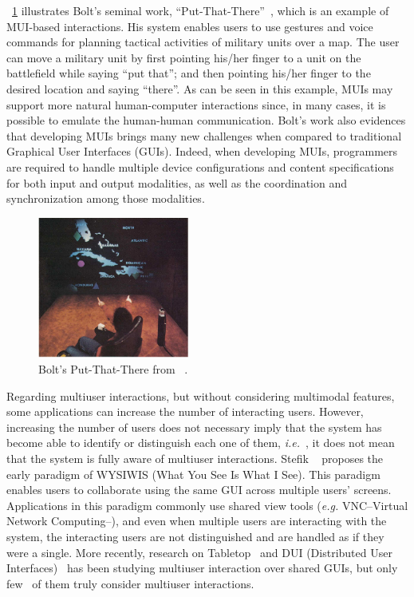 \documentclass[
  doutorado,
  american
]{ThesisPUC}
\newcommand{\fig}[1]{\figurename~\ref{#1}}
\newcommand{\captionvspace}{\vspace{-1.3em}}
\begin{document}
\fig{fig:bolt} illustrates Bolt’s seminal work, 
“Put-That-There”~\cite{bolt_put-that-there:_1980}, which is an example of 
MUI-based interactions.
His system enables users to use gestures and voice commands for planning
tactical activities of military units over a map. The user can move a military
unit by first pointing his/her finger to a unit on the battlefield while saying
“put that”; and then pointing his/her finger to the desired location and saying
“there”. As can be seen in this example, MUIs may support more natural
human-computer interactions since, in many cases, it is possible to emulate the
human-human communication. Bolt’s work also evidences that developing MUIs
brings many new challenges when compared to traditional Graphical User
Interfaces (GUIs). Indeed, when developing MUIs, programmers are required to
handle multiple device configurations and content specifications for both input
and output modalities, as well as the coordination and synchronization among
those modalities.

\begin{figure}[!ht]
\begin{center}
	\includegraphics[width=5cm, keepaspectratio]{img/img1.png}
	\caption[Bolt's Put-That-There]{Bolt's Put-That-There from
	~\cite{turk_multimodal_2014}.}
	\label{fig:bolt}
    \captionvspace
\end{center}
\end{figure}

Regarding multiuser interactions, but without considering multimodal features,
some applications can increase the number of interacting users. However,
increasing the number of users does not necessary imply that the system has
become able to identify or distinguish each one of them, \textit{i.e.}~, it does not mean
that the system is fully aware of multiuser interactions. Stefik
~\cite{stefik_wysiwis_1987} proposes the early paradigm of WYSIWIS (What You See
Is What I See). This paradigm enables users to collaborate using the same GUI
across multiple users’ screens. Applications in this paradigm commonly use
shared view tools (\textit{e.g.} VNC--Virtual Network Computing--), and even when multiple users are interacting with
the system, the interacting users are not distinguished and are handled as if they were a single. More recently, research on 
Tabletop~\cite{muller-tomfelde_introduction:_2010} and DUI (Distributed
User Interfaces)~\cite{elmqvist_distributed_2011} has been studying multiuser
interaction over shared GUIs, but only few~\cite{dietz_diamondtouch:_2001} of
them truly consider multiuser interactions.
\end{document}
